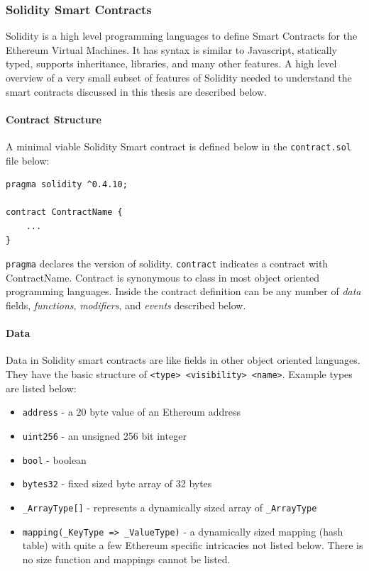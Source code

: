 \documentclass[a4paper,12pt]{article} %
\def\code#1{\texttt{#1}}
\begin{document}
\subsubsection{Solidity Smart Contracts} \label{sssec:2:ethereum:soliditySmartContracts}

Solidity is a high level programming languages to define Smart Contracts for the Ethereum Virtual Machines\cite{solidity}. It has syntax is similar to Javascript, statically typed, supports inheritance, libraries, and many other features. A high level overview of a very small subset of features of Solidity needed to understand the smart contracts discussed in this thesis are described below.

\paragraph*{Contract Structure}

A minimal viable Solidity Smart contract is defined below in the \code{contract.sol} file below:

\begin{lstlisting}
pragma solidity ^0.4.10;

contract ContractName {
	...
}
\end{lstlisting}

\code{pragma} declares the version of solidity. \code{contract} indicates a contract with ContractName. Contract is synonymous to class in most object oriented programming languages. Inside the contract definition can be any number of \textit{data} fields, \textit{functions}, \textit{modifiers}, and \textit{events} described below.

\paragraph*{Data}

Data in Solidity smart contracts are like fields in other object oriented languages. They have the basic structure of \code{<type> <visibility> <name>}. Example types are listed below:

\begin{itemize}
	\item \code{address} - a 20 byte value of an Ethereum address
	\item \code{uint256} - an unsigned 256 bit integer
	\item \code{bool} - boolean
	\item \code{bytes32} - fixed sized byte array of 32 bytes
	\item \code{\_ArrayType[]} - represents a dynamically sized array of \code{\_ArrayType}
	\item \code{mapping(\_KeyType => \_ValueType)} - a dynamically sized mapping (hash table) with quite a few Ethereum specific intricacies not listed below. There is no size function and mappings cannot be listed.
\end{itemize}
\end{document}
